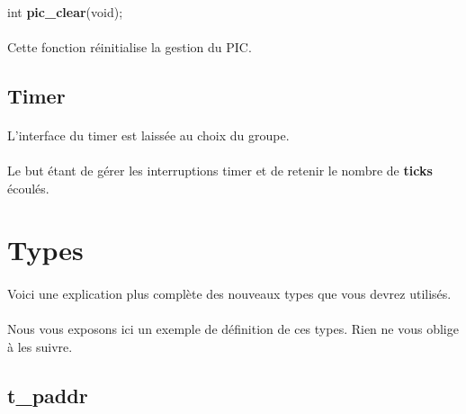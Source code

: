 \documentclass[10pt,a4wide]{article}
\begin{document}
\paragraph{}

\hspace{1.5cm}int \textbf{pic\_clear}(void);

\paragraph{}

Cette fonction r\'einitialise la gestion du PIC.

\subsection{Timer}

\paragraph{}

L'interface du timer est laiss\'ee au choix du groupe.

\paragraph{}

Le but \'etant de g\'erer les interruptions timer et de retenir le nombre
de \textbf{ticks} \'ecoul\'es.

\section{Types}

\paragraph{}

Voici une explication plus compl\`ete des nouveaux types que
vous devrez utilis\'es.

\paragraph{}

Nous vous exposons ici un exemple de d\'efinition de ces types. Rien ne vous
oblige \`a les suivre.

\subsection{t\_paddr}
\end{document}
